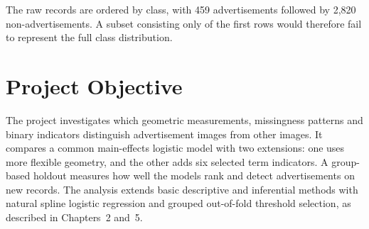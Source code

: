 The raw records are ordered by class, with 459 advertisements followed
by 2,820 non-advertisements. A subset consisting only of the first rows
would therefore fail to represent the full class distribution.
\section{Project Objective}
The project investigates which geometric measurements, missingness patterns
and binary indicators distinguish advertisement images from other images.
It compares a common main-effects logistic model with two extensions:
one uses more flexible geometry, and the other adds six selected term
indicators. A group-based holdout measures how well the models rank and
detect advertisements on new records.
The analysis extends basic descriptive and inferential methods with
natural spline logistic regression and grouped out-of-fold threshold
selection, as described in Chapters~2 and~5.
